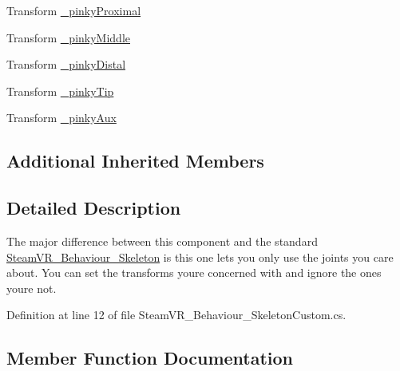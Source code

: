 \begin{DoxyCompactItemize}
\item 
Transform \mbox{\hyperlink{class_valve_1_1_v_r_1_1_steam_v_r___behaviour___skeleton_custom_a39c1201f3d175a65dc71ce7644c98ea4}{\+\_\+pinky\+Proximal}}
\item 
Transform \mbox{\hyperlink{class_valve_1_1_v_r_1_1_steam_v_r___behaviour___skeleton_custom_a9b8d5244d42d7c8a06e373b1f2627cf0}{\+\_\+pinky\+Middle}}
\item 
Transform \mbox{\hyperlink{class_valve_1_1_v_r_1_1_steam_v_r___behaviour___skeleton_custom_ab8e15e771fdaee462e8d71261b048c4a}{\+\_\+pinky\+Distal}}
\item 
Transform \mbox{\hyperlink{class_valve_1_1_v_r_1_1_steam_v_r___behaviour___skeleton_custom_a2c7b0d0ddabf60c906e1a556f6a49eb5}{\+\_\+pinky\+Tip}}
\item 
Transform \mbox{\hyperlink{class_valve_1_1_v_r_1_1_steam_v_r___behaviour___skeleton_custom_a6304aad188ed0a284fb9ad39d9a5dea7}{\+\_\+pinky\+Aux}}
\end{DoxyCompactItemize}
\subsection*{Additional Inherited Members}


\subsection{Detailed Description}
The major difference between this component and the standard \mbox{\hyperlink{class_valve_1_1_v_r_1_1_steam_v_r___behaviour___skeleton}{Steam\+V\+R\+\_\+\+Behaviour\+\_\+\+Skeleton}} is this one lets you only use the joints you care about. You can set the transforms you\textquotesingle{}re concerned with and ignore the ones you\textquotesingle{}re not. 



Definition at line 12 of file Steam\+V\+R\+\_\+\+Behaviour\+\_\+\+Skeleton\+Custom.\+cs.



\subsection{Member Function Documentation}
\mbox{\label{class_valve_1_1_v_r_1_1_steam_v_r___behaviour___skeleton_custom_a5184aa62aa3f49cd99d826ca0a71bc87}} 
